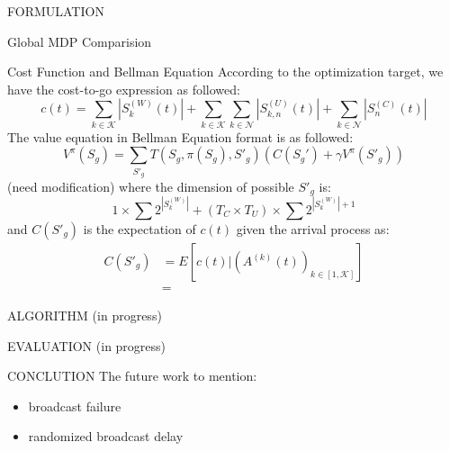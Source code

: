 \documentclass[10pt, conference, letterpaper]{IEEEtran}
\begin{document}
\begin{section}{FORMULATION}
\begin{subsection}{Global MDP Comparision}
            \begin{subsubsection}{Cost Function and Bellman Equation}
                According to the optimization target, we have the cost-to-go expression as followed:
                $$
                c(t) = \sum_{k \in \mathcal{K}}{|S^{(W)}_{k}(t)|}
                        + \sum_{k \in \mathcal{K}}\sum_{k \in \mathcal{N}}{|S^{(U)}_{k,n}(t)|}
                        + \sum_{k \in \mathcal{N}}{|S^{(C)}_{n}(t)|}
                $$
                The value equation in Bellman Equation format is as followed:
                $$
                V^{\pi}(S_g) = \sum_{S'_g} T(S_g, \pi(S_g), S'_g) (C(S_g') + \gamma V^{\pi}(S'_g))
                $$
                (need modification) where the dimension of possible $S'_g$ is:
                $$
                1 \times \sum{2^{|S^{(W)}_k|}} + (T_C \times T_U) \times \sum{2^{|S^{(W)}_k|+1}}
                $$
                and $C(S'_g)$ is the expectation of $c(t)$ given the arrival process as:
                \begin{align*}
                    C(S'_g) &= E[c(t)|(A^{(k)}(t))_{k \in [1,\mathcal{K}]}]
                    \\
                    &= 
                \end{align*}
            \end{subsubsection}
        \end{subsection}
        
    \end{section}

    \begin{section}{ALGORITHM}
        \label{sec:algorithm}
        (in progress)
    \end{section}

    \begin{section}{EVALUATION}
        \label{sec:evaluation}
        (in progress)
    \end{section}

    \begin{section}{CONCLUTION}
        \label{sec:conclusion}
        The future work to mention:
        \begin{itemize}
            \item broadcast failure
            \item randomized broadcast delay
        \end{itemize}
    \end{section}

    
    
\end{document}
